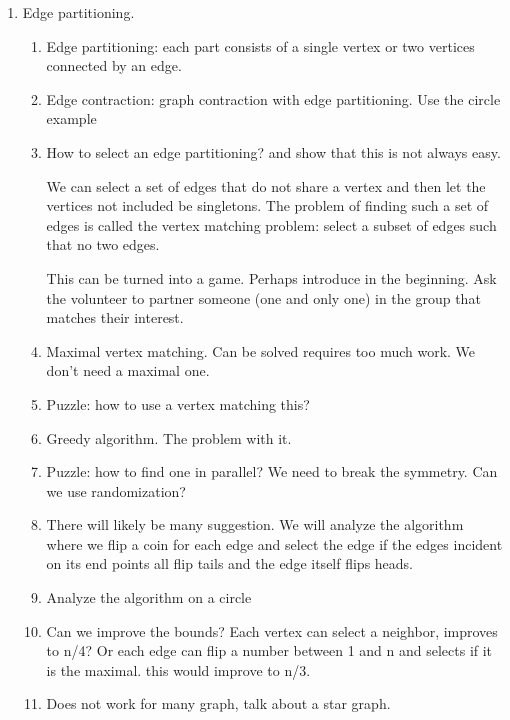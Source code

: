 {\begin{notesonly}
\begin{enumerate}
\item Edge partitioning.
\begin{enumerate}
\item Edge partitioning: each part consists of a single vertex or
  two vertices connected by an edge.

\item Edge contraction: graph contraction with edge partitioning. Use
  the circle example~

\item How to select an edge partitioning?  
  and show that this is not always easy.

  We can select a set of edges that do not share a vertex and then let
  the vertices not included be singletons.  The problem of finding
  such a set of edges is called the vertex matching problem: select a
  subset of edges such that no two edges.

  This can be turned into a game.  Perhaps introduce in the beginning.
  Ask the volunteer to partner someone (one and only one) in the group
  that matches their interest.


\item Maximal vertex matching. Can be solved requires too much
  work. We don't need a maximal one.

\item Puzzle: how to use a vertex matching this?

\item Greedy algorithm.  The problem with it.

\item Puzzle: how to find one in parallel?  We need to break the
  symmetry.  Can we use randomization?

\item There will likely be many suggestion.  We will analyze the
  algorithm where we flip a coin for each edge and select the edge if
  the edges incident on its end points all flip tails and the edge
  itself flips heads.

\item Analyze the algorithm on a circle

\item Can we improve the bounds?  Each vertex can select a neighbor,
  improves to n/4?
  Or each edge can flip a number between 1 and n and selects if it is
  the maximal. this would improve to n/3.

\item Does not work for many graph, talk about a star graph.



\end{enumerate}
\end{enumerate}
\end{notesonly}}
